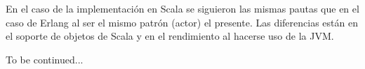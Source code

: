 
En el caso de la implementación en Scala se siguieron las mismas pautas que en el caso de Erlang al ser el mismo patrón (actor) el presente. Las diferencias están en el soporte de objetos de Scala y en el rendimiento al hacerse uso de la JVM.

To be continued...